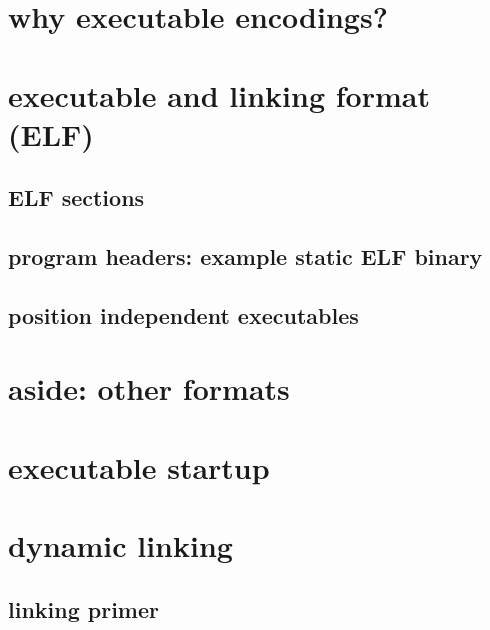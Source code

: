 \section{why executable encodings?}


\section{executable and linking format (ELF)}



\subsection{ELF sections}




\subsection{program headers: example static ELF binary}



\subsection{position independent executables}



\section{aside: other formats}



\section{executable startup} %



\section{dynamic linking}

\subsection{linking primer}

